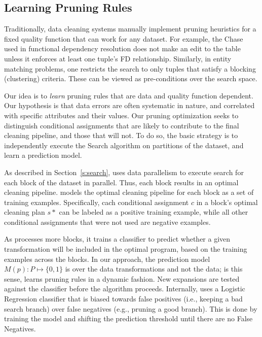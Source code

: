 \subsection{Learning Pruning Rules}\label{s:pruning}

Traditionally, data cleaning systems manually implement pruning heuristics for a fixed quality function that can work for any dataset. For example, the Chase~\cite{} used in functional dependency resolution does not make an edit to the table unless it enforces at least one tuple's FD relationship.  Similarly, in entity matching problems, one restricts the search to only tuples that satisfy a blocking (clustering) criteria.  These can be viewed as pre-conditions over the search space.

Our idea is to {\it learn} pruning rules that are data and quality function dependent.  Our hypothesis is that data errors are often systematic in nature, and correlated with specific attributes and their values.  Our pruning optimization seeks to distinguish conditional assignments that are likely to contribute to the final cleaning pipeline, and those that will not.  To do so, the basic strategy is to independently execute the Search algorithm on partitions of the dataset, and learn a prediction model.   




As described in Section~\ref{s:search}, \sys uses data parallelism to execute search for each block of the dataset in parallel.  Thus, each block results in an optimal cleaning pipeline.  \sys models the optimal cleaning pipeline for each block as a set of training examples.  Specifically, cach conditional assignment $c$ in a block's optimal cleaning plan $s*$ can be labeled as a positive training example, while all other conditional assignments that were not used are negative examples.  

As \sys processes more blocks, it trains a classifier to predict whether a given transformation will be included in the optimal program, based on the training examples across the blocks.  In our approach, the prediction model $M(p): P \mapsto \{0,1\}$ is over the data transformations and not the data; is this sense, \sys learns pruning rules in a dynamic fashion. 
New expansions are tested against the classifier before the algorithm proceeds.
Internally, \sys uses a Logistic Regression classifier that is biased towards false positives (i.e., keeping a bad search branch) over false negatives (e.g., pruning a good branch). This is done by training the model and shifting the prediction threshold until there are no False Negatives. 

